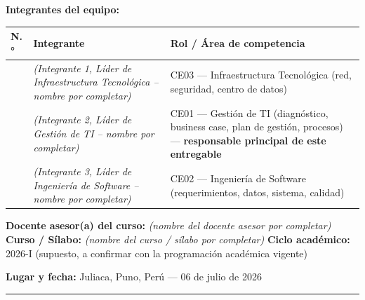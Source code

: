\documentclass[11pt,a4paper]{article}
\begin{document}
\textbf{Integrantes del equipo:}

{\small
\begin{longtable}[]{@{}
  >{\raggedright\arraybackslash}p{}
  >{\raggedright\arraybackslash}p{}
  >{\raggedright\arraybackslash}p{}@{}}
\toprule\noalign{}
\begin{minipage}[b]{\linewidth}\raggedright
N.°
\end{minipage} & \begin{minipage}[b]{\linewidth}\raggedright
Integrante
\end{minipage} & \begin{minipage}[b]{\linewidth}\raggedright
Rol / Área de competencia
\end{minipage} \\
\midrule\noalign{}
\endhead
\bottomrule\noalign{}
\endlastfoot
1 & \textit{(Integrante 1, Líder de Infraestructura Tecnológica -- nombre por completar)} & CE03 --- Infraestructura Tecnológica (red, seguridad, centro de datos) \\
2 & \textit{(Integrante 2, Líder de Gestión de TI -- nombre por completar)} & CE01 --- Gestión de TI (diagnóstico, business case, plan de gestión, procesos) --- \textbf{responsable principal de este entregable} \\
3 & \textit{(Integrante 3, Líder de Ingeniería de Software -- nombre por completar)} & CE02 --- Ingeniería de Software (requerimientos, datos, sistema, calidad) \\
\end{longtable}
}

\textbf{Docente asesor(a) del curso:} \textit{(nombre del docente asesor por completar)}
\textbf{Curso / Sílabo:} \textit{(nombre del curso / s\'ilabo por completar)}
\textbf{Ciclo académico:} 2026-I (supuesto, a confirmar con la programación académica vigente)

\textbf{Lugar y fecha:} Juliaca, Puno, Perú --- 06 de julio de 2026

\begin{center}\rule{0.5\linewidth}{0.5pt}\end{center}
\end{document}
